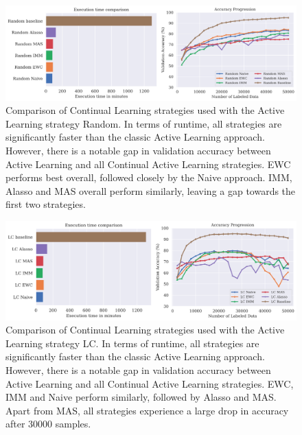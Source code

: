 \begin{figure} [ht]
    \centering
    \includegraphics[width=\linewidth]{images/results_CAL/Random_CAL_2000b.png}
    \caption[Continual Active Learning Random 2000 batch size]{Comparison of Continual Learning strategies used with the Active Learning strategy Random. In terms of runtime, all
    strategies are significantly faster than the classic Active Learning approach. However, there is a notable gap in validation accuracy between Active Learning and all Continual
    Active Learning strategies. EWC performs best overall, followed closely by the Naive approach. IMM, Alasso and MAS overall perform similarly, leaving a gap towards the first 
    two strategies.}
    \label{fig:Evaluation:Results:CAL:Random2000}
\end{figure}

\begin{figure} [ht]
    \centering
    \includegraphics[width=\linewidth]{images/results_CAL/LC_CAL_2000b.png}
    \caption[Continual Active Learning Random 2000 batch size]{Comparison of Continual Learning strategies used with the Active Learning strategy LC. In terms of runtime, all
    strategies are significantly faster than the classic Active Learning approach. However, there is a notable gap in validation accuracy between Active Learning and all Continual
    Active Learning strategies. EWC, IMM and Naive perform similarly, followed by Alasso and MAS. Apart from MAS, all strategies experience a large drop in accuracy after 30000 samples.}
    \label{fig:Evaluation:Results:CAL:LC2000}
\end{figure}

